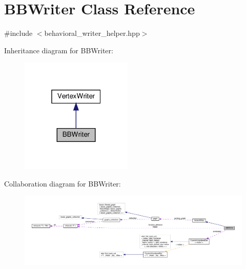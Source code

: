 \hypertarget{classBBWriter}{}\section{B\+B\+Writer Class Reference}
\label{classBBWriter}


{\ttfamily \#include $<$behavioral\+\_\+writer\+\_\+helper.\+hpp$>$}



Inheritance diagram for B\+B\+Writer\+:
\nopagebreak
\begin{figure}[H]
\begin{center}
\leavevmode
\includegraphics[width=151pt]{d4/d7c/classBBWriter__inherit__graph}
\end{center}
\end{figure}


Collaboration diagram for B\+B\+Writer\+:
\nopagebreak
\begin{figure}[H]
\begin{center}
\leavevmode
\includegraphics[width=350pt]{d4/d4b/classBBWriter__coll__graph}
\end{center}
\end{figure}
